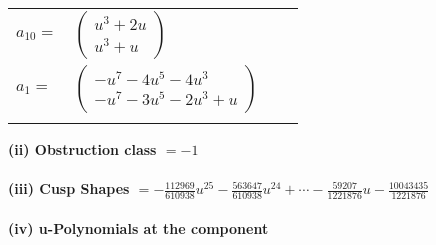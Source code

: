 \documentclass[1p]{elsarticle_modified}
\theoremstyle{definition}
\begin{document}
\begin{tabular}{m{7pt} m{180pt} m{7pt} m{180pt} }
\flushright $a_{10}=$&$\begin{pmatrix}u^3+2 u\\u^3+u\end{pmatrix}$ \\
\flushright $a_{1}=$&$\begin{pmatrix}- u^7-4 u^5-4 u^3\\- u^7-3 u^5-2 u^3+u\end{pmatrix}$\\&\end{tabular}
\flushleft \textbf{(ii) Obstruction class $= -1$}\\~\\
\flushleft \textbf{(iii) Cusp Shapes $= -\frac{112969}{610938} u^{25}-\frac{563647}{610938} u^{24}+\cdots-\frac{59207}{1221876} u-\frac{10043435}{1221876}$}\\~\\
\newpage\renewcommand{\arraystretch}{1}
\flushleft \textbf{(iv) u-Polynomials at the component}\newline \\
\end{document}

